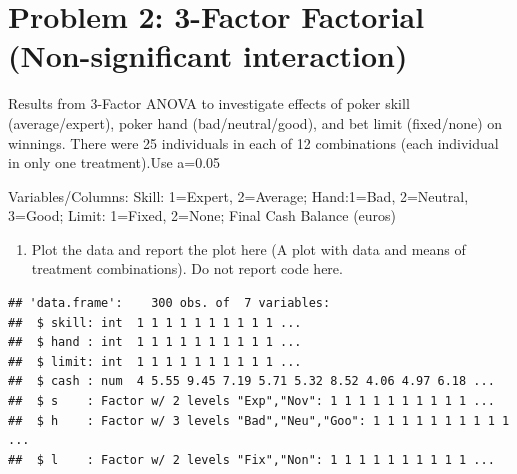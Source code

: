 \documentclass[]{article}
\newenvironment{Shaded}{\begin{snugshade}}{\end{snugshade}}
\newcommand{\DataTypeTok}[1]{\textcolor[rgb]{0.13,0.29,0.53}{#1}}
\newcommand{\DecValTok}[1]{\textcolor[rgb]{0.00,0.00,0.81}{#1}}
\newcommand{\KeywordTok}[1]{\textcolor[rgb]{0.13,0.29,0.53}{\textbf{#1}}}
\newcommand{\NormalTok}[1]{#1}
\newcommand{\OperatorTok}[1]{\textcolor[rgb]{0.81,0.36,0.00}{\textbf{#1}}}
\newcommand{\StringTok}[1]{\textcolor[rgb]{0.31,0.60,0.02}{#1}}
\providecommand{\tightlist}{%
  \setlength{\itemsep}{0pt}\setlength{\parskip}{0pt}}
\begin{document}
\begin{Shaded}
\end{Shaded}

\hypertarget{problem-2-3-factor-factorial-non-significant-interaction}{%
\section{Problem 2: 3-Factor Factorial (Non-significant
interaction)}\label{problem-2-3-factor-factorial-non-significant-interaction}}

\textcolor[rgb]{0.5,0.5,0.5}{Results from 3-Factor ANOVA to investigate effects of poker skill (average/expert), poker hand (bad/neutral/good), and bet limit (fixed/none) on winnings. There were 25 individuals in each of 12 combinations (each individual in only one treatment).Use a=0.05}

\textcolor[rgb]{0.5,0.5,0.5}{Variables/Columns:
Skill: 1=Expert, 2=Average; Hand:1=Bad, 2=Neutral, 3=Good; Limit: 1=Fixed, 2=None; Final Cash Balance (euros)}

\begin{enumerate}
\def\labelenumi{(\alph{enumi})}
\tightlist
\item
  \textcolor[rgb]{0.5,0.5,0.5}{Plot the data and report the plot here (A plot with data and means of treatment combinations). Do not report code here.}
\end{enumerate}

\begin{verbatim}
## 'data.frame':    300 obs. of  7 variables:
##  $ skill: int  1 1 1 1 1 1 1 1 1 1 ...
##  $ hand : int  1 1 1 1 1 1 1 1 1 1 ...
##  $ limit: int  1 1 1 1 1 1 1 1 1 1 ...
##  $ cash : num  4 5.55 9.45 7.19 5.71 5.32 8.52 4.06 4.97 6.18 ...
##  $ s    : Factor w/ 2 levels "Exp","Nov": 1 1 1 1 1 1 1 1 1 1 ...
##  $ h    : Factor w/ 3 levels "Bad","Neu","Goo": 1 1 1 1 1 1 1 1 1 1 ...
##  $ l    : Factor w/ 2 levels "Fix","Non": 1 1 1 1 1 1 1 1 1 1 ...
\end{verbatim}
\end{document}
